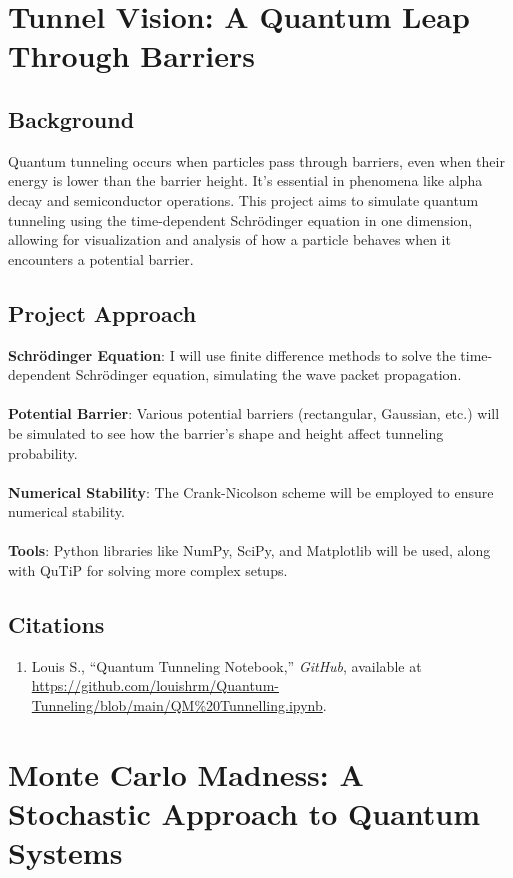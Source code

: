 \documentclass{article}
\begin{document}
\newpage

\section{Tunnel Vision: A Quantum Leap Through Barriers}

\subsection{Background} 
Quantum tunneling occurs when particles pass through barriers, even when their energy is lower than the barrier height. It’s essential in phenomena like alpha decay and semiconductor operations. This project aims to simulate quantum tunneling using the time-dependent Schrödinger equation in one dimension, allowing for visualization and analysis of how a particle behaves when it encounters a potential barrier.

\subsection{Project Approach}
\textbf{Schrödinger Equation}: I will use finite difference methods to solve the time-dependent Schrödinger equation, simulating the wave packet propagation.\\\\
\textbf{Potential Barrier}: Various potential barriers (rectangular, Gaussian, etc.) will be simulated to see how the barrier's shape and height affect tunneling probability.\\\\
\textbf{Numerical Stability}: The Crank-Nicolson scheme will be employed to ensure numerical stability.\\\\
\textbf{Tools}: Python libraries like NumPy, SciPy, and Matplotlib will be used, along with QuTiP for solving more complex setups.

\subsection{Citations}
\begin{enumerate}
    \item Louis S., “Quantum Tunneling Notebook,” \textit{GitHub}, available at \url{https://github.com/louishrm/Quantum-Tunneling/blob/main/QM%20Tunnelling.ipynb}.
\end{enumerate}

\newpage

\section{Monte Carlo Madness: A Stochastic Approach to Quantum Systems}
\end{document}

